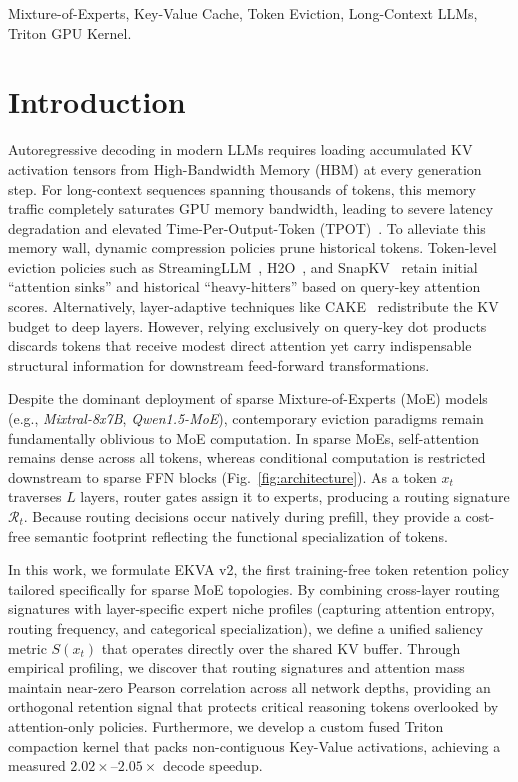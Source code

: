\documentclass[conference]{IEEEtran}
\begin{document}
\begin{IEEEkeywords}
Mixture-of-Experts, Key-Value Cache, Token Eviction, Long-Context LLMs, Triton GPU Kernel.
\end{IEEEkeywords}

\section{Introduction}
Autoregressive decoding in modern LLMs requires loading accumulated KV activation tensors from High-Bandwidth Memory (HBM) at every generation step. For long-context sequences spanning thousands of tokens, this memory traffic completely saturates GPU memory bandwidth, leading to severe latency degradation and elevated Time-Per-Output-Token (TPOT)~\cite{dao2023flashattention2}. To alleviate this memory wall, dynamic compression policies prune historical tokens. Token-level eviction policies such as StreamingLLM~\cite{xiao2023streamingllm}, H2O~\cite{zhang2023h2o}, and SnapKV~\cite{li2024snapkv} retain initial ``attention sinks'' and historical ``heavy-hitters'' based on query-key attention scores. Alternatively, layer-adaptive techniques like CAKE~\cite{cake2025} redistribute the KV budget to deep layers. However, relying exclusively on query-key dot products discards tokens that receive modest direct attention yet carry indispensable structural information for downstream feed-forward transformations.

Despite the dominant deployment of sparse Mixture-of-Experts (MoE) models (e.g., \emph{Mixtral-8x7B}, \emph{Qwen1.5-MoE}), contemporary eviction paradigms remain fundamentally oblivious to MoE computation. In sparse MoEs, self-attention remains dense across all tokens, whereas conditional computation is restricted downstream to sparse FFN blocks (Fig.~\ref{fig:architecture}). As a token $x_t$ traverses $L$ layers, router gates assign it to experts, producing a routing signature $\mathcal{R}_t$. Because routing decisions occur natively during prefill, they provide a cost-free semantic footprint reflecting the functional specialization of tokens.

In this work, we formulate EKVA v2, the first training-free token retention policy tailored specifically for sparse MoE topologies. By combining cross-layer routing signatures with layer-specific expert niche profiles (capturing attention entropy, routing frequency, and categorical specialization), we define a unified saliency metric $S(x_t)$ that operates directly over the shared KV buffer. Through empirical profiling, we discover that routing signatures and attention mass maintain near-zero Pearson correlation across all network depths, providing an orthogonal retention signal that protects critical reasoning tokens overlooked by attention-only policies. Furthermore, we develop a custom fused Triton compaction kernel that packs non-contiguous Key-Value activations, achieving a measured $2.02\times$--$2.05\times$ decode speedup.
\end{document}
